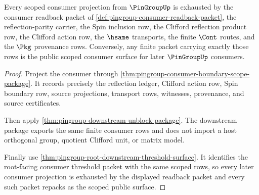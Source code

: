 \begin{theorem}
\label{thm:pingroup-scoped-consumer-projection-exhaustion}
Every scoped consumer projection from $\PinGroupUp$ is exhausted by the
consumer readback packet of
\autoref{def:pingroup-consumer-readback-packet}, the reflection-parity carrier,
the Spin inclusion row, the Clifford reflection product row, the Clifford
action row, the $\hsame$ transports, the finite $\Cont$ routes, and the $\Pkg$
provenance rows. Conversely, any finite packet carrying exactly those rows is
the public scoped consumer surface for later $\PinGroupUp$ consumers.
\end{theorem}
\begin{proof}
Project the consumer through
\autoref{thm:pingroup-consumer-boundary-scope-package}. It records precisely the
reflection ledger, Clifford action row, Spin boundary row, source projections,
transport rows, witnesses, provenance, and source certificates.

Then apply \autoref{thm:pingroup-downstream-unblock-package}. The downstream
package exports the same finite consumer rows and does not import a host
orthogonal group, quotient Clifford unit, or matrix model.

Finally use \autoref{thm:pingroup-root-downstream-threshold-surface}. It
identifies the root-facing consumer threshold packet with the same scoped
rows, so every later consumer projection is exhausted by the displayed
readback packet and every such packet repacks as the scoped public surface.
\end{proof}
